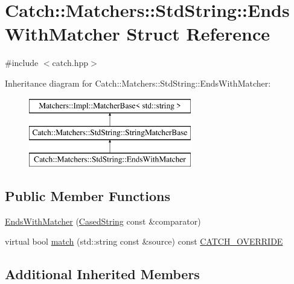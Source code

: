 \hypertarget{structCatch_1_1Matchers_1_1StdString_1_1EndsWithMatcher}{\section{Catch\-:\-:Matchers\-:\-:Std\-String\-:\-:Ends\-With\-Matcher Struct Reference}
\label{structCatch_1_1Matchers_1_1StdString_1_1EndsWithMatcher}
}


{\ttfamily \#include $<$catch.\-hpp$>$}

Inheritance diagram for Catch\-:\-:Matchers\-:\-:Std\-String\-:\-:Ends\-With\-Matcher\-:\begin{figure}[H]
\begin{center}
\leavevmode
\includegraphics[height=3.000000cm]{structCatch_1_1Matchers_1_1StdString_1_1EndsWithMatcher}
\end{center}
\end{figure}
\subsection*{Public Member Functions}
\begin{DoxyCompactItemize}
\item 
\hyperlink{structCatch_1_1Matchers_1_1StdString_1_1EndsWithMatcher_aa5ec700b4629562f74f362080accfd7b}{Ends\-With\-Matcher} (\hyperlink{structCatch_1_1Matchers_1_1StdString_1_1CasedString}{Cased\-String} const \&comparator)
\item 
virtual bool \hyperlink{structCatch_1_1Matchers_1_1StdString_1_1EndsWithMatcher_a21c6dc68e30716d5c718f4f8c3186af1}{match} (std\-::string const \&source) const \hyperlink{catch_8hpp_a8ecdce4d3f57835f707915ae831eb847}{C\-A\-T\-C\-H\-\_\-\-O\-V\-E\-R\-R\-I\-D\-E}
\end{DoxyCompactItemize}
\subsection*{Additional Inherited Members}


